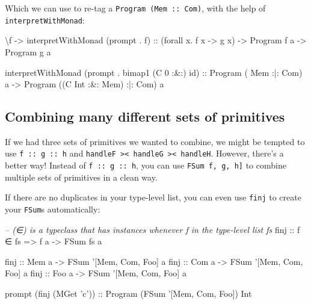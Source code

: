 \documentclass[]{article}
\newenvironment{Shaded}{}{}
\newcommand{\CharTok}[1]{\textcolor[rgb]{0.25,0.44,0.63}{#1}}
\newcommand{\CommentTok}[1]{\textcolor[rgb]{0.38,0.63,0.69}{\textit{#1}}}
\newcommand{\DataTypeTok}[1]{\textcolor[rgb]{0.56,0.13,0.00}{#1}}
\newcommand{\DecValTok}[1]{\textcolor[rgb]{0.25,0.63,0.44}{#1}}
\newcommand{\FunctionTok}[1]{\textcolor[rgb]{0.02,0.16,0.49}{#1}}
\newcommand{\NormalTok}[1]{#1}
\newcommand{\OtherTok}[1]{\textcolor[rgb]{0.00,0.44,0.13}{#1}}
\begin{document}
Which we can use to re-tag a \texttt{Program\ (Mem\ :\textbar{}:\ Com)}, with
the help of \texttt{interpretWithMonad}:

\begin{Shaded}
\begin{Highlighting}[]
\NormalTok{\textbackslash{}f }\OtherTok{->}\NormalTok{ interpretWithMonad (prompt }\FunctionTok{.}\NormalTok{ f)}
\OtherTok{    ::}\NormalTok{ (forall x}\FunctionTok{.}\NormalTok{ f x }\OtherTok{->}\NormalTok{ g x)}
    \OtherTok{->} \DataTypeTok{Program}\NormalTok{ f a}
    \OtherTok{->} \DataTypeTok{Program}\NormalTok{ g a}

\NormalTok{interpretWithMonad (prompt }\FunctionTok{.}\NormalTok{ bimap1 (}\DataTypeTok{C} \DecValTok{0} \FunctionTok{:&:}\NormalTok{) id)}
\OtherTok{    ::} \DataTypeTok{Program}\NormalTok{ (      }\DataTypeTok{Mem}       \FunctionTok{:|:} \DataTypeTok{Com}\NormalTok{) a}
    \OtherTok{->} \DataTypeTok{Program}\NormalTok{ ((}\DataTypeTok{C} \DataTypeTok{Int} \FunctionTok{:&:} \DataTypeTok{Mem}\NormalTok{) }\FunctionTok{:|:} \DataTypeTok{Com}\NormalTok{) a}
\end{Highlighting}
\end{Shaded}

\hypertarget{combining-many-different-sets-of-primitives}{%
\subsection{Combining many different sets of
primitives}\label{combining-many-different-sets-of-primitives}}

If we had three sets of primitives we wanted to combine, we might be tempted to
use \texttt{f\ :\textbar{}:\ g\ :\textbar{}:\ h} and
\texttt{handleF\ \textgreater{}\textbar{}\textless{}\ handleG\ \textgreater{}\textbar{}\textless{}\ handleH}.
However, there's a better way! Instead of
\texttt{f\ :\textbar{}:\ g\ :\textbar{}:\ h}, you can use
\texttt{FSum\ \textquotesingle{}{[}f,\ g,\ h{]}} to combine multiple sets of
primitives in a clean way.

If there are no duplicates in your type-level list, you can even use
\texttt{finj} to create your \texttt{FSum}s automatically:

\begin{Shaded}
\begin{Highlighting}[]
\CommentTok{-- (∈) is a typeclass that has instances whenever f in the type-level list fs}
\OtherTok{finj ::}\NormalTok{ f ∈ fs }\OtherTok{=>}\NormalTok{ f a }\OtherTok{->} \DataTypeTok{FSum}\NormalTok{ fs a}

\OtherTok{finj ::} \DataTypeTok{Mem}\NormalTok{ a }\OtherTok{->} \DataTypeTok{FSum} \CharTok{'[Mem, Com, Foo] a}
\OtherTok{finj ::} \DataTypeTok{Com}\NormalTok{ a }\OtherTok{->} \DataTypeTok{FSum} \CharTok{'[Mem, Com, Foo] a}
\OtherTok{finj ::} \DataTypeTok{Foo}\NormalTok{ a }\OtherTok{->} \DataTypeTok{FSum} \CharTok{'[Mem, Com, Foo] a}

\NormalTok{prompt (finj (}\DataTypeTok{MGet} \CharTok{'c'}\NormalTok{))}\OtherTok{ ::} \DataTypeTok{Program}\NormalTok{ (}\DataTypeTok{FSum} \CharTok{'[Mem, Com, Foo]) Int}
\end{Highlighting}
\end{Shaded}
\end{document}
